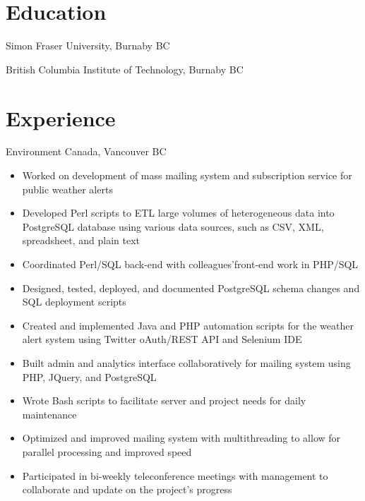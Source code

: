 \documentclass{ik-resume}
\begin{document}
\section{Education}

Simon Fraser University, Burnaby BC

\vspace{.5em}
British Columbia Institute of Technology, Burnaby BC


\section{Experience}


Environment Canada, Vancouver BC

\begin{itemize}
  \itemsep0em
  \item Worked on development of mass mailing system and subscription service for public weather alerts
  \item Developed Perl scripts to ETL large volumes of heterogeneous data into PostgreSQL database using various data sources, such as CSV, XML, spreadsheet, and plain text
  \item Coordinated Perl/SQL back-end with colleagues'front-end work in PHP/SQL
  \item Designed, tested, deployed, and documented PostgreSQL schema changes and SQL deployment scripts
  \item Created and implemented Java and PHP automation scripts for the weather alert system using Twitter oAuth/REST API and Selenium IDE
  \item Built admin and analytics interface collaboratively for mailing system using PHP, JQuery, and PostgreSQL
  \item Wrote Bash scripts to facilitate server and project needs for daily maintenance
  \item Optimized and improved mailing system with multithreading to allow for parallel processing and improved speed
  \item Participated in bi-weekly teleconference meetings with management to collaborate and update on the project's progress
\end{itemize}
\end{document}
